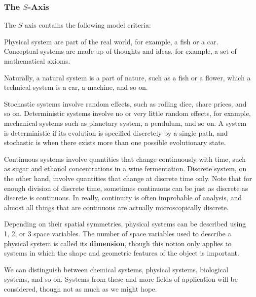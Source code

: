 \subsubsection{The $S$-Axis}
The $S$ axis contains the following model criteria: 
\begin{description}[leftmargin=2pt,font=\normalfont\itshape\space]
    \item[Physical-conceptual] Physical system are part of the real world, for example, a fish or a car. Conceptual systems are made up of thoughts and ideas, for example, a set of mathematical axioms. 
    \item[Natural-technical] Naturally, a natural system is a part of nature, such as a fish or a flower, which a technical system is a car, a machine, and so on. 
    \item[Stochastic-deterministic] Stochastic systems involve random effects, such as rolling dice, share prices, and so on. Deterministic systems involve no or very little random effects, for example, mechanical systems such as planetary system, a pendulum, and so on. A system is deterministic if its evolution is specified discretely by a single path, and stochastic is when there exists more than one possible evolutionary state. 
    \item[Continuous-discrete] Continuous systems involve quantities that change continuously with time, such as sugar and ethanol concentrations in a wine fermentation. Discrete system, on the other hand, involve quantities that change at discrete time only. Note that for enough division of discrete time, sometimes continuous can be just as discrete as discrete is continuous. In really, continuity is often improbable of analysis, and almost all things that are continuous are actually microscopically discrete.
    \item[Dimension] Depending on their spatial symmetries, physical systems can be described using 1, 2, or 3 space variables. The number of space variables used to describe a physical system is called its \textbf{dimension}, though this notion only applies to systems in which the shape and geometric features of the object is important.  
    \item[Field of application] We can distinguish between chemical systems, physical systems, biological systems, and so on. Systems from these and more fields of application will be considered, though not as much as we might hope.  
\end{description}
